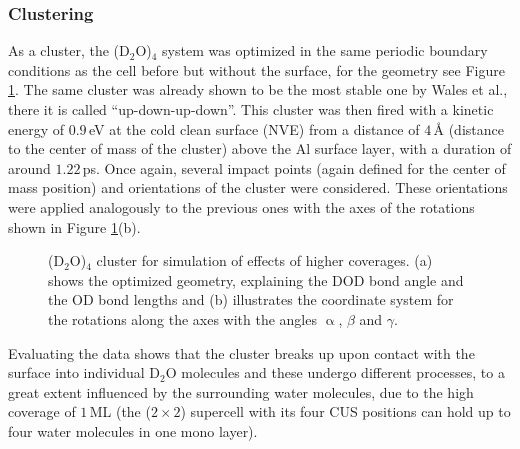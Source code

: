 \documentclass[11pt,DIV=13,BCOR=5mm,a4paper,headinclude]{scrbook}
\begin{document}
\subsubsection{Clustering}\label{clusters}
As a cluster, the (D$_2$O)$_4$ system was optimized in the same periodic boundary conditions as the cell before but without the surface, for the geometry see Figure \ref{abb:D2Ocluster}.
The same cluster was already shown to be the most stable one by Wales et al.\cite{Wales97}, there it is called ``up-down-up-down''.
This cluster was then fired with a kinetic energy of $0.9\,$eV at the cold clean surface (NVE) from a distance of $4\,$\AA{} (distance to the center of mass of the cluster) above the Al surface layer, with a duration of around $1.22\,$ps.
Once again, several impact points (again defined for the center of mass position) and orientations of the cluster were considered.
These orientations were applied analogously to the previous ones with the axes of the rotations shown in Figure \ref{abb:D2Ocluster}(b).
\\
\begin{figure} [!ht]
\centering
  \quad
{}
\caption{(D$_2$O)$_4$ cluster for simulation of effects of higher coverages.
(a) shows the optimized geometry, explaining the DOD bond angle and the OD bond lengths and (b) illustrates the coordinate system for the rotations along the axes with the angles $\upalpha$, $\beta$ and $\gamma$.}
       \label{abb:D2Ocluster}
\end{figure}
Evaluating the data shows that the cluster breaks up upon contact with the surface into individual D$_2$O molecules and these undergo different processes, to a great extent influenced by the surrounding water molecules, due to the high coverage of $1\,$ML (the ($2\times 2$) supercell with its four CUS positions can hold up to four water molecules in one mono layer).
\end{document}

